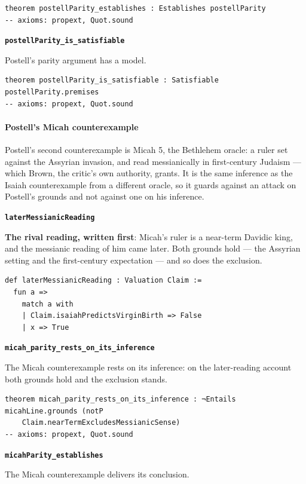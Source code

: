 \documentclass[11pt]{article}
\begin{document}
{\small\begin{verbatim}
theorem postellParity_establishes : Establishes postellParity
-- axioms: propext, Quot.sound
\end{verbatim}}
\par\medskip\noindent\textbf{\texttt{postell\allowbreak{}Parity\_\allowbreak{}is\_\allowbreak{}satisfiable}}\par\nobreak\noindent
Postell's parity argument has a model.

{\small\begin{verbatim}
theorem postellParity_is_satisfiable : Satisfiable postellParity.premises
-- axioms: propext, Quot.sound
\end{verbatim}}
\paragraph*{Postell's Micah counterexample}
\leavevmode\par
Postell's second counterexample is Micah 5, the Bethlehem oracle: a ruler set against the Assyrian invasion, and read messianically in first-century Judaism — which Brown, the critic's own authority, grants. It is the same inference as the Isaiah counterexample from a different oracle, so it guards against an attack on Postell's grounds and not against one on his inference.

\par\medskip\noindent\textbf{\texttt{later\allowbreak{}Messianic\allowbreak{}Reading}}\par\nobreak\noindent
\textbf{The rival reading, written first}: Micah's ruler is a near-term Davidic king, and the messianic reading of him came later. Both grounds hold — the Assyrian setting and the first-century expectation — and so does the exclusion.

{\small\begin{verbatim}
def laterMessianicReading : Valuation Claim :=
  fun a =>
    match a with
    | Claim.isaiahPredictsVirginBirth => False
    | x => True
\end{verbatim}}
\par\medskip\noindent\textbf{\texttt{micah\_\allowbreak{}parity\_\allowbreak{}rests\_\allowbreak{}on\_\allowbreak{}its\_\allowbreak{}inference}}\par\nobreak\noindent
The Micah counterexample rests on its inference: on the later-reading account both grounds hold and the exclusion stands.

{\small\begin{verbatim}
theorem micah_parity_rests_on_its_inference : ¬Entails micahLine.grounds (notP
    Claim.nearTermExcludesMessianicSense)
-- axioms: propext, Quot.sound
\end{verbatim}}
\par\medskip\noindent\textbf{\texttt{micah\allowbreak{}Parity\_\allowbreak{}establishes}}\par\nobreak\noindent
The Micah counterexample delivers its conclusion.
\end{document}
